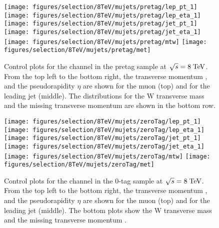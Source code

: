 \begin{figure}
  \centering
  \texttt{[image: figures/selection/8TeV/mujets/pretag/lep\_pt\_1]}
  \texttt{[image: figures/selection/8TeV/mujets/pretag/lep\_eta\_1]}
  \texttt{[image: figures/selection/8TeV/mujets/pretag/jet\_pt\_1]}
  \texttt{[image: figures/selection/8TeV/mujets/pretag/jet\_eta\_1]}
  \texttt{[image: figures/selection/8TeV/mujets/pretag/mtw]}
  \texttt{[image: figures/selection/8TeV/mujets/pretag/met]}
  \caption[Control plots for the \mujets{} channel in the pretag
    sample at $\sqrt{s} = 8 \TeV{}$]{Control plots for the \mujets{} channel in the pretag
    sample at $\sqrt{s} = 8 \TeV{}$.  From the top left to the bottom right, the transverse
    momentum \pt{}, and the pseudorapidity $\eta$ are shown for the
    muon (top) and for the leading jet (middle).  The distributions
    for the W transverse mass \mtw{} and the missing transverse
    momentum \met{} are shown in the bottom row. 
  }
  \label{fig:2012mu_pretag}
\end{figure}
%
\begin{figure}
  \centering
  \texttt{[image: figures/selection/8TeV/mujets/zeroTag/lep\_pt\_1]}
  \texttt{[image: figures/selection/8TeV/mujets/zeroTag/lep\_eta\_1]}
  \texttt{[image: figures/selection/8TeV/mujets/zeroTag/jet\_pt\_1]}
  \texttt{[image: figures/selection/8TeV/mujets/zeroTag/jet\_eta\_1]}
  \texttt{[image: figures/selection/8TeV/mujets/zeroTag/mtw]}
  \texttt{[image: figures/selection/8TeV/mujets/zeroTag/met]}
  \caption[Control plots for the \mujets{} channel in the 0-tag
    sample at $\sqrt{s} = 8 \TeV{}$]{Control plots for the \mujets{} channel in the 0-tag
    sample at $\sqrt{s} = 8 \TeV{}$.  From the top left to the bottom right, the transverse
    momentum \pt{}, and the pseudorapidity $\eta$ are shown for the
    muon (top) and for the leading jet (middle). The bottom plots show
    the W transverse mass \mtw{} and the missing transverse
    momentum \met{}. 
  }
  \label{fig:2012mu_0tag}
\end{figure}
%
